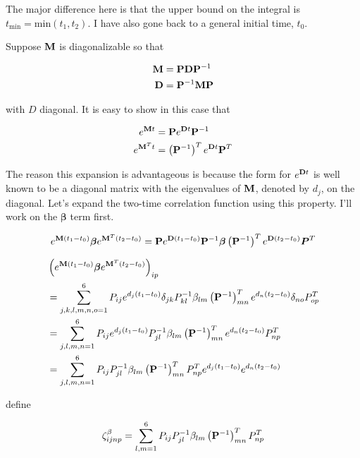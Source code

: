 \documentclass[12pt]{article}
\newcommand{\bv}[1]{\bold{#1}}
\newcommand{\bs}[1]{\boldsymbol{#1}}
\begin{document}
The major difference here is that the upper bound on the integral is $t_{\text{min}} = \text{min}(t_1,t_2)$. I have also gone back to a general initial time, $t_0$.

Suppose $\bv{M}$ is diagonalizable so that

\begin{align}
\bv{M} &= \bv{P} \bv{D} \bv{P}^{-1}\\
\bv{D} &= \bv{P}^{-1} \bv{M} \bv{P}
\end{align}

with $D$ diagonal. It is easy to show in this case that

\begin{align}
e^{\bv{M}t} &= \bv{P} e^{\bv{D}t} \bv{P}^{-1}\\
e^{\bv{M}^T t} &= \left(\bv{P}^{-1}\right)^T e^{\bv{D}t} \bv{P}^T\\
\end{align}

The reason this expansion is advantageous is because the form for $e^{\bv{D}t}$ is well known to be a diagonal matrix with the eigenvalues of $\bv{M}$, denoted by $d_j$, on the diagonal.
Let's expand the two-time correlation function using this property. I'll work on the $\bs{\beta}$ term first.

\begin{align}
e^{\bv{M}(t_1-t_0)} \bs{\beta} e^{\bv{M}^T (t_2-t_0)} &= \bv{P}e^{\bv{D}(t_1-t_0)} \bv{P}^{-1} \bs{\beta} \left(\bv{P}^{-1}\right)^T e^{\bv{D}(t_2-t_0)}\bs{P}^T\\
\end{align}

\begin{align}
&\left(e^{\bv{M}(t_1-t_0)} \bs{\beta} e^{\bv{M}^T (t_2-t_0)}\right)_{ip}\\
 &= \sum_{j,k,l,m,n,o=1}^6 P_{ij} e^{d_j(t_1-t_0)} \delta_{jk} P^{-1}_{kl} \beta_{lm} \left(\bv{P}^{-1}\right)^T_{mn} e^{d_n (t_2-t_0)} \delta_{no} P^{T}_{op}\\
&=\sum_{j,l,m,n = 1}^6 P_{ij} e^{d_j (t_1-t_0)} P^{-1}_{jl} \beta_{lm} \left(\bv{P}^{-1}\right)^T_{mn} e^{d_n (t_2-t_0)} P^{T}_{np}\\
&=\sum_{j,l,m,n = 1}^6 P_{ij} P^{-1}_{jl} \beta_{lm} \left(\bv{P}^{-1}\right)^T_{mn} P^{T}_{np} e^{d_j (t_1-t_0)} e^{d_n (t_2-t_0)}  \\
\end{align}

define

\begin{align}
\zeta_{ijnp}^{\beta} = \sum_{l,m=1}^6 P_{ij} P^{-1}_{jl} \beta_{lm} \left(\bv{P}^{-1}\right)^T_{mn} P^{T}_{np}
\end{align}
\end{document}
